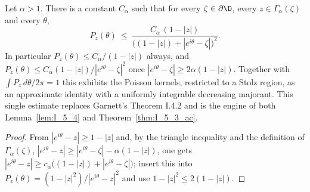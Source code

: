 \begin{lemma}
  \label{lem:poisson_stolz_bound}
  \leanok
  Let $\alpha>1$. There is a constant $C_\alpha$ such that for every
  $\zeta\in\partial\D$, every $z\in\Gamma_\alpha(\zeta)$ and every
  $\theta$,
  \[
    P_z(\theta)\ \le\
      \frac{C_\alpha\,(1-|z|)}{\bigl((1-|z|)+|e^{i\theta}-\zeta|\bigr)^{2}} .
  \]
  In particular $P_z(\theta)\le C_\alpha/(1-|z|)$ always, and
  $P_z(\theta)\le C_\alpha (1-|z|)/|e^{i\theta}-\zeta|^{2}$ once
  $|e^{i\theta}-\zeta|\ge 2\alpha(1-|z|)$. Together with
  $\int P_z\,d\theta/2\pi=1$ this exhibits the Poisson kernels, restricted to a
  Stolz region, as an approximate identity with a uniformly integrable
  decreasing majorant. This single estimate replaces Garnett's Theorem I.4.2
  and is the engine of both Lemma~\ref{lem:I_5_4} and
  Theorem~\ref{thm:I_5_3_ac}.
  \begin{proof}
    \leanok
    From $|e^{i\theta}-z|\ge 1-|z|$ and, by the triangle inequality and the
    definition of $\Gamma_\alpha(\zeta)$,
    $|e^{i\theta}-z|\ge|e^{i\theta}-\zeta|-\alpha(1-|z|)$, one gets
    $|e^{i\theta}-z|\ge c_\alpha\bigl((1-|z|)+|e^{i\theta}-\zeta|\bigr)$;
    insert this into $P_z(\theta)=(1-|z|^2)/|e^{i\theta}-z|^{2}$ and use
    $1-|z|^2\le 2(1-|z|)$.
  \end{proof}
\end{lemma}

